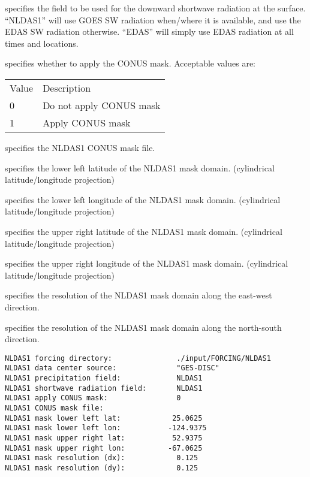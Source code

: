   specifies the field to be
 used for the downward shortwave radiation at the surface.  ``NLDAS1''
 will use GOES SW radiation when/where it is available, and use the
 EDAS SW radiation otherwise.  ``EDAS'' will simply use EDAS radiation
 at all times and locations.

  specifies whether to apply the
 CONUS mask.
 Acceptable values are:

 \begin{tabular}{ll}
 Value & Description             \\
 0     & Do not apply CONUS mask \\
 1     & Apply CONUS mask        \\
 \end{tabular}

  specifies the NLDAS1 CONUS mask file.

  specifies the lower left latitude
 of the NLDAS1 mask domain. (cylindrical latitude/longitude projection)

  specifies the lower left longitude
 of the NLDAS1 mask domain. (cylindrical latitude/longitude projection)

  specifies the upper right latitude
 of the NLDAS1 mask domain. (cylindrical latitude/longitude projection)

  specifies the upper right longitude
 of the NLDAS1 mask domain. (cylindrical latitude/longitude projection)

  specifies the resolution of the 
 NLDAS1 mask domain along the east-west direction.

  specifies the resolution of the 
 NLDAS1 mask domain along the north-south direction.
 

 \begin{Verbatim}[frame=single]
NLDAS1 forcing directory:               ./input/FORCING/NLDAS1
NLDAS1 data center source:              "GES-DISC"
NLDAS1 precipitation field:             NLDAS1
NLDAS1 shortwave radiation field:       NLDAS1
NLDAS1 apply CONUS mask:                0
NLDAS1 CONUS mask file:
NLDAS1 mask lower left lat:            25.0625
NLDAS1 mask lower left lon:           -124.9375
NLDAS1 mask upper right lat:           52.9375
NLDAS1 mask upper right lon:          -67.0625
NLDAS1 mask resolution (dx):            0.125
NLDAS1 mask resolution (dy):            0.125
 \end{Verbatim}

